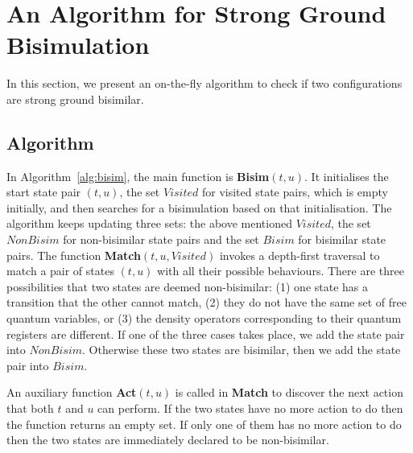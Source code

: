\documentclass[runningheads]{llncs}
\begin{document}
\appendix
\section{An Algorithm for Strong Ground Bisimulation}
\label{sec:strong_bisim}
In this section, we present an on-the-fly algorithm to check if two configurations are strong ground bisimilar.
\subsection{Algorithm}\label{sec:strong_bisim_alg}
In Algorithm~\ref{alg:bisim}, the main function is \textbf{Bisim}$(t,u)$. It initialises the start state pair $(t,u)$, the set $Visited$ for visited state pairs, which is empty initially, and then searches for a bisimulation based on that initialisation. 
The algorithm keeps updating three sets: the above mentioned $Visited$, the set $NonBisim$ for non-bisimilar state pairs and the set $Bisim$ for bisimilar state pairs. The function \textbf{Match}$(t,u,Visited)$ invokes a depth-first traversal to match a pair of 
states $(t,u)$ with all their possible behaviours. There are three possibilities that two states are deemed non-bisimilar:  (1) one state has a transition that the other cannot match, (2) they do not have the same set of free quantum variables, or (3) the density operators corresponding to their quantum registers are different. If one of the three cases takes place, we add the state pair into $NonBisim$. Otherwise these two states are bisimilar, then we add the state pair into $Bisim$.

An auxiliary function \textbf{Act}$(t,u)$ is called in \textbf{Match} to discover the next action that both $t$ and $u$ can perform. If the two states have no more action to do then the function returns an empty set. If only one of them has no more action to do then the two states are immediately declared to be non-bisimilar. 
\end{document}
